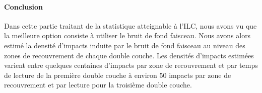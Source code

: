 % 
% 
  
  \paragraph{Conclusion}
  
  Dans cette partie traitant de la statistique atteignable \`a l'ILC, nous avons vu que la meilleure option consiste \`a utiliser le bruit de fond faisceau. Nous avons alors estim\'e la densit\'e d'impacts induite par le bruit de fond faisceau au niveau des zones de recouvrement de chaque double couche. Les densit\'es d'impacts estim\'ees varient entre quelques centaines d'impacts par zone de recouvrement et par temps de lecture de la premi\`ere double couche \`a environ 50 impacts par zone de recouvrement et par lecture pour la troisi\`eme double couche. 
  
